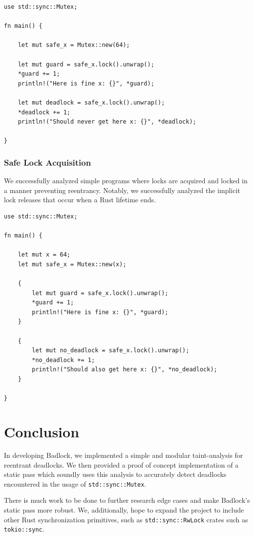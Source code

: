 \documentclass[conference]{IEEEtran}
\begin{document}
\begin{lstlisting}[caption={Program With A Simple Deadlock}, label=lst:rust_example]
use std::sync::Mutex;

fn main() {

    let mut safe_x = Mutex::new(64);
    
    let mut guard = safe_x.lock().unwrap();
    *guard += 1;
    println!("Here is fine x: {}", *guard);

    let mut deadlock = safe_x.lock().unwrap();
    *deadlock += 1;
    println!("Should never get here x: {}", *deadlock);

}
\end{lstlisting}

\subsubsection{Safe Lock Acquisition}
We successfully analyzed simple programs where locks are acquired and locked in a manner preventing reentrancy. Notably, we successfully analyzed the implicit lock releases that occur when a Rust lifetime ends.

\begin{lstlisting}[caption={Program With Safe Lock Acquisition}, label=lst:rust_example]
use std::sync::Mutex;

fn main() {

    let mut x = 64;
    let mut safe_x = Mutex::new(x);
    
    {
        let mut guard = safe_x.lock().unwrap();
        *guard += 1;
        println!("Here is fine x: {}", *guard);
    }

    {
        let mut no_deadlock = safe_x.lock().unwrap();
        *no_deadlock += 1;
        println!("Should also get here x: {}", *no_deadlock);
    }

}
\end{lstlisting}

\section{Conclusion}
In developing Badlock, we implemented a simple and modular taint-analysis for reentrant deadlocks. We then provided a proof of concept implementation of a static pass which soundly uses this analysis to accurately detect deadlocks encountered in the usage of \verb|std::sync::Mutex|. 

There is much work to be done to further research edge cases and make Badlock's static pass more robust. We, additionally, hope to expand the project to include other Rust synchronization primitives, such as \verb|std::sync::RwLock| crates such as \verb|tokio::sync|.
\end{document}
